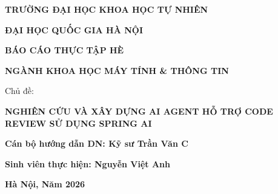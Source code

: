 \documentclass[12pt,a4paper]{report}
\begin{document}
\begin{titlepage}
    \centering 
    
    {\fontsize{14pt}{17pt}\selectfont \bfseries TRƯỜNG ĐẠI HỌC KHOA HỌC TỰ NHIÊN\par}
    \vspace{0.25cm}
    {\fontsize{14pt}{17pt}\selectfont \bfseries ĐẠI HỌC QUỐC GIA HÀ NỘI\par}
    
    \vfill 
    \vspace{0.5cm}
    
    \vspace{0.75cm}
    
    {\fontsize{16pt}{19pt}\selectfont \bfseries BÁO CÁO THỰC TẬP HÈ\par}
    \vspace{0.25cm}
    
    {\fontsize{20pt}{24pt}\selectfont \bfseries NGÀNH KHOA HỌC MÁY TÍNH \& THÔNG TIN\par} 
    
    \vspace{0.75cm}
    
    {\fontsize{14pt}{17pt}\selectfont \bfseries \raggedright Chủ đề:\par}
    \vspace{0.25cm}
    
    {\fontsize{18pt}{22pt}\selectfont \bfseries NGHIÊN CỨU VÀ XÂY DỰNG AI AGENT HỖ TRỢ CODE REVIEW SỬ DỤNG SPRING AI\par}
    
    \vfill
    
    \vspace{0.5cm}
    \begin{minipage}{0.9\textwidth} 
        \raggedright 

        {\fontsize{12pt}{15pt}\selectfont \bfseries Cán bộ hướng dẫn DN: Kỹ sư Trần Văn C \par}
        \vspace{0.25cm}
        
        {\fontsize{12pt}{15pt}\selectfont \bfseries Sinh viên thực hiện: Nguyễn Việt Anh\par}
        \vspace{0.25cm}
        
    \end{minipage}
    
    \vspace{1cm} 
    
    {\fontsize{12pt}{15pt}\selectfont \bfseries Hà Nội, Năm 2026\par}

    
\end{titlepage}
\end{document}
